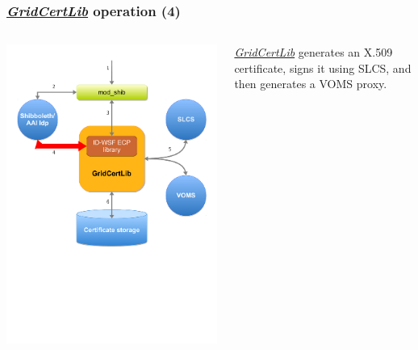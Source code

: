 \documentclass{beamer}
\newcommand{\+}{\vspace{1em}}
\newcommand{\GridCertLib}{\href{http://gridcertlib.googlecode.com/}{{\em GridCertLib}}}
\begin{document}
\begin{frame}
  \frametitle{\GridCertLib{} operation (4)}
  \begin{columns}
    \begin{column}{0.5\textwidth}
    \includegraphics[width=\linewidth,viewport=0 300 600 650]{architecture4}
    \end{column}
    \begin{column}{0.5\textwidth}
      \begin{center}
        \GridCertLib{} generates an X.509 certificate, signs it using
        SLCS, and then generates a VOMS proxy.
      \end{center}
    \end{column}
  \end{columns}
\end{frame}
\end{document}
